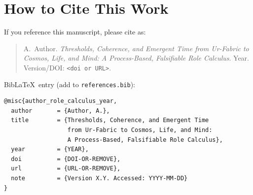 \documentclass[12pt,a4paper,oneside]{scrreprt}
\begin{document}
\chapter*{How to Cite This Work}
If you reference this manuscript, please cite as:
\begin{quote}
A.~Author. \emph{Thresholds, Coherence, and Emergent Time from Ur-Fabric to Cosmos, Life, and Mind: A Process-Based, Falsifiable Role Calculus}. Year. Version/DOI: \texttt{<doi or URL>}.
\end{quote}
\noindent Bib\LaTeX\ entry (add to \texttt{references.bib}):
\begin{verbatim}
@misc{author_role_calculus_year,
  author       = {Author, A.},
  title        = {Thresholds, Coherence, and Emergent Time
                  from Ur-Fabric to Cosmos, Life, and Mind:
                  A Process-Based, Falsifiable Role Calculus},
  year         = {YEAR},
  doi          = {DOI-OR-REMOVE},
  url          = {URL-OR-REMOVE},
  note         = {Version X.Y. Accessed: YYYY-MM-DD}
}
\end{verbatim}

\nocite{*}
\printbibliography[heading=bibintoc,title={References}]
\end{document}
